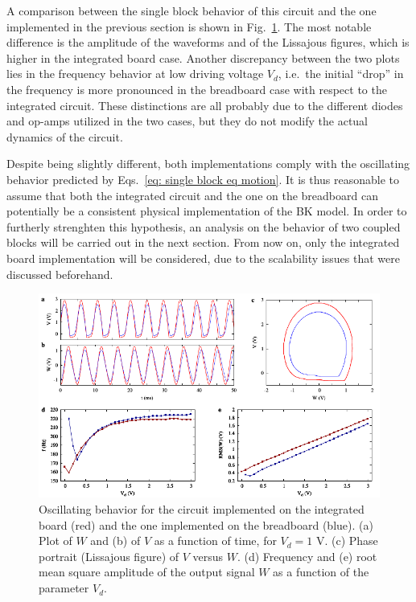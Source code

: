 A comparison between the single block behavior of this circuit and the one implemented in the previous section
is shown in Fig.~\ref{fig:oscillation board}. The most notable difference is the amplitude of the waveforms and of
the Lissajous figures, which is higher in the integrated board case. Another discrepancy between the two plots lies
in the frequency behavior at low driving voltage $V_d$, i.e.\ the initial ``drop'' in the frequency is more pronounced
in the breadboard case with respect to the integrated circuit. These distinctions are all probably due to the different diodes
and op-amps utilized in the two cases, but they do not modify the actual dynamics of the circuit.

Despite being slightly different, both implementations comply with the oscillating behavior predicted by
Eqs.~\ref{eq: single block eq motion}. It is thus reasonable to assume that both the integrated circuit and the one on the
breadboard can potentially be a consistent physical implementation of the BK model. In order to furtherly strenghten
this hypothesis, an analysis on the behavior of two coupled blocks will be carried out in the next section.
From now on, only the integrated board implementation will be considered, due to the scalability issues that were discussed
beforehand.

\begin{figure}[!htbp]
    \centering
    \includegraphics[width=\linewidth]{../blocks/1_block/board_new/single_block.pdf}
    \caption{Oscillating behavior for the circuit implemented on
    the integrated board (red) and the one implemented on the breadboard (blue).
    (a) Plot of $W$ and (b) of $V$ as a function of time, for $V_d=1$ V.
    (c) Phase portrait (Lissajous figure) of $V$ versus $W$. (d)
    Frequency and (e) root mean square amplitude of the
    output signal $W$ as a function of the parameter $V_d$.}\label{fig:oscillation board}
\end{figure}


